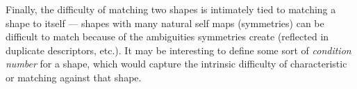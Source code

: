 Finally, the difficulty of matching two shapes is
intimately tied to matching a shape to itself --- shapes with many
natural self maps (symmetries) can be difficult to match because of
the ambiguities symmetries create (reflected in duplicate descriptors,
etc.). It may be interesting to define some sort of {\em condition
  number} for a shape, which would capture the intrinsic difficulty of
characteristic or matching against that shape.



